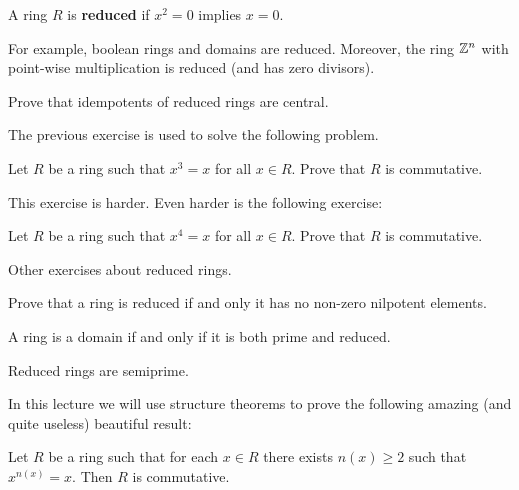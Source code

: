 \begin{definition}
	A ring $R$ is \textbf{reduced} if $x^2=0$ implies $x=0$. 
\end{definition}

For example, boolean rings and domains are reduced. Moreover, the ring 
$\mathbb{Z}^n$ with point-wise multiplication is reduced (and has zero divisors).

\begin{exercise}
    Prove that idempotents of reduced rings are central. 
\end{exercise}

The previous exercise is used to solve the following problem.

\begin{exercise}
    Let $R$ be a ring such that $x^3=x$ for all $x\in R$. Prove that
    $R$ is commutative. 
\end{exercise}

This exercise is harder. Even harder is the following exercise:

\begin{exercise}
    Let $R$ be a ring such that $x^4=x$ for all $x\in R$. Prove
    that $R$ is commutative. 
\end{exercise}

Other exercises about reduced rings. 

\begin{exercise}
\label{xca:reduced}
    Prove that a ring is reduced if 
    and only it has no non-zero nilpotent elements. 
\end{exercise}

\begin{exercise}
\label{xca:domain<=>prime+reduced}
    A ring is a domain if and only if
    it is both prime and reduced. 
\end{exercise}

\begin{exercise}
\label{xca:reduced=>semiprime}
    Reduced rings are semiprime.
\end{exercise}
    
In this lecture we will use
structure theorems to prove the following amazing (and quite useless) 
beautiful result:

\begin{theorem}[Jacobson]
\label{thm:commutativity}
	Let $R$ be a ring such that 
	for each $x\in R$ there exists $n(x)\geq2$ such that 
	$x^{n(x)}=x$. Then $R$ is commutative. 
\end{theorem}

